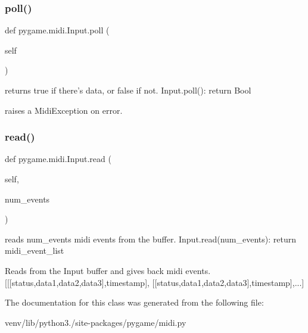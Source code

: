 \subsubsection{\texorpdfstring{poll()}{poll()}}
{\footnotesize\ttfamily def pygame.\+midi.\+Input.\+poll (\begin{DoxyParamCaption}\item[{}]{self }\end{DoxyParamCaption})}

\begin{DoxyVerb}returns true if there's data, or false if not.
Input.poll(): return Bool

raises a MidiException on error.
\end{DoxyVerb}
 \mbox{\label{classpygame_1_1midi_1_1_input_ae815968ae5fcf52f9d86a6f9611bc2fa}} 
\subsubsection{\texorpdfstring{read()}{read()}}
{\footnotesize\ttfamily def pygame.\+midi.\+Input.\+read (\begin{DoxyParamCaption}\item[{}]{self,  }\item[{}]{num\+\_\+events }\end{DoxyParamCaption})}

\begin{DoxyVerb}reads num_events midi events from the buffer.
Input.read(num_events): return midi_event_list

Reads from the Input buffer and gives back midi events.
[[[status,data1,data2,data3],timestamp],
 [[status,data1,data2,data3],timestamp],...]
\end{DoxyVerb}
 

The documentation for this class was generated from the following file\+:\begin{DoxyCompactItemize}
\item 
venv/lib/python3./site-\/packages/pygame/midi.\+py\end{DoxyCompactItemize}
